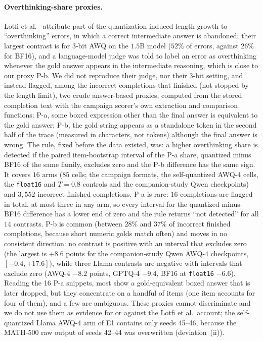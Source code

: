 \documentclass[11pt,a4paper]{article}
\begin{document}
\paragraph{Overthinking-share proxies.} Lotfi et al.~\cite{lotfi2026overthinking} attribute part of the quantization-induced length growth to ``overthinking'' errors, in which a correct intermediate answer is abandoned; their largest contrast is for 3-bit AWQ on the $1.5$B model ($52\%$ of errors, against $26\%$ for BF16), and a language-model judge was told to label an error as overthinking whenever the gold answer appears in the intermediate reasoning, which is close to our proxy P-b. We did not reproduce their judge, nor their 3-bit setting, and instead flagged, among the incorrect completions that finished (not stopped by the length limit), two crude answer-based proxies, computed from the stored completion text with the campaign scorer's own extraction and comparison functions: P-a, some boxed expression other than the final answer is equivalent to the gold answer; P-b, the gold string appears as a standalone token in the second half of the trace (measured in characters, not tokens) although the final answer is wrong. The rule, fixed before the data existed, was: a higher overthinking share is detected if the paired item-bootstrap interval of the P-a share, quantized minus BF16 of the same family, excludes zero and the P-b difference has the same sign. It covers $16$ arms ($85$ cells; the campaign formats, the self-quantized AWQ-4 cells, the \texttt{float16} and $T=0.8$ controls and the companion-study Qwen checkpoints) and $3{,}552$ incorrect finished completions. P-a is rare: $16$ completions are flagged in total, at most three in any arm, so every interval for the quantized-minus-BF16 difference has a lower end of zero and the rule returns ``not detected'' for all $14$ contrasts. P-b is common (between $28\%$ and $37\%$ of incorrect finished completions, because short numeric golds match often) and moves in no consistent direction: no contrast is positive with an interval that excludes zero (the largest is $+8.6$ points for the companion-study Qwen AWQ-4 checkpoints, $[-0.4,+17.6]$), while three Llama contrasts are negative with intervals that exclude zero (AWQ-4 $-8.2$ points, GPTQ-4 $-9.4$, BF16 at \texttt{float16} $-6.6$). Reading the 16 P-a snippets, most show a gold-equivalent boxed answer that is later dropped, but they concentrate on a handful of items (one item accounts for four of them), and a few are ambiguous. These proxies cannot discriminate and we do not use them as evidence for or against the Lotfi et al.\ account; the self-quantized Llama AWQ-4 arm of E1 contains only seeds 45--46, because the MATH-500 raw output of seeds 42--44 was overwritten (deviation~(ii)).
\end{document}
